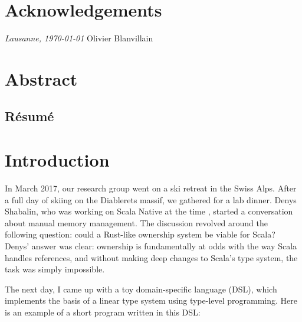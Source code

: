 



\frontmatter

\setcounter{page}{0}

\chapter{Acknowledgements}
\lipsum[1-2]

\bigskip
\noindent\textit{Lausanne, \today}
\hfill Olivier Blanvillain

\cleardoublepage
\chapter*{Abstract}
\lipsum[1-2] %
\begin{otherlanguage}{french}
\cleardoublepage
\chapter*{Résumé}
\lipsum[1-2]
\end{otherlanguage}

\hypersetup{linkcolor=black}
\tableofcontents
\cleardoublepage
{}
{}
\listoffigures
\hypersetup{linkcolor=purplish}
\mainmatter


\chapter{Introduction}
\label{chap:introduction}

In March 2017, our research group went on a ski retreat in the Swiss Alps.
After a full day of skiing on the Diablerets massif, we gathered for a lab dinner.
Denys Shabalin, who was working on Scala Native at the time \citep{shabalin2020just}, started a conversation about manual memory management.
The discussion revolved around the following question: could a Rust-like ownership system be viable for Scala?
Denys' answer was clear: ownership is fundamentally at odds with the way Scala handles references, and without making deep changes to Scala's type system, the task was simply impossible.

The next day, I came up with a toy domain-specific language (DSL), which implements the basis of a linear type system using type-level programming.
Here is an example of a short program written in this DSL:

